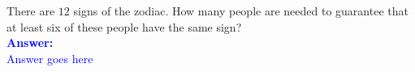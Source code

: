 \item{}
There are $12$ signs of the zodiac. How many people are needed to guarantee
that at least six of these people have the same sign?\\[12pt]
\ifanswers
\textcolor{blue}{
\textbf{Answer:}\\[6pt]
Answer goes here
}
\newpage
\fi
